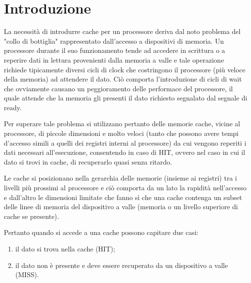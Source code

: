 \clearpage{\pagestyle{empty}\cleardoublepage}
\chapter*{Introduzione} 


La necessit\`a di introdurre cache per un processore deriva dal noto problema del "collo di bottiglia" rappresentato dall'accesso a dispositivi di memoria.
Un processore durante il suo funzionamento tende ad accedere in scrittura o a reperire dati in lettura  provenienti dalla memoria a valle e tale operazione richiede tipicamente diversi cicli di clock che costringono il processore (pi\`u veloce della memoria) ad attendere il dato.
Ci\`o comporta l'introduzione di cicli di wait che ovviamente causano un peggioramento delle performace del processore, il quale attende che la memoria gli presenti il dato richiesto segnalato dal segnale di ready.

Per superare tale problema si utilizzano pertanto delle memorie cache, vicine al processore, di piccole dimensioni e molto veloci (tanto che possono avere tempi d'accesso simili a quelli dei registri interni al processore) da cui vengono reperiti i dati necessari all'esecuzione, consentendo in caso di HIT, ovvero nel caso in cui il dato si trovi in cache, di recuperarlo quasi senza ritardo.

Le cache si posizionano nella gerarchia delle memorie (insieme ai registri) tra i livelli pi\`u prossimi al processore e ci\`o comporta da un lato la rapidit\`a nell'accesso e dall'altro le dimensioni limitate che fanno s\`i che una cache contenga un subset delle linee di memoria del dispositivo a valle (memoria o un livello 
superiore di cache se presente). 

Pertanto quando si accede a una cache possono capitare due casi:
\begin{enumerate}
\item il dato si trova nella cache (HIT);
\item il dato non \`e presente e deve essere recuperato da un dispositivo a valle (MISS). 
\end{enumerate}

